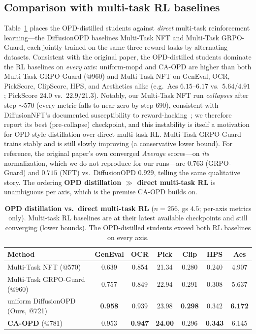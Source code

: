 \subsection{Comparison with multi-task RL baselines}
\label{sec:exp-baselines}
Table~\ref{tab:baselines} places the OPD-distilled students against \emph{direct} multi-task
reinforcement learning---the DiffusionOPD baselines Multi-Task NFT and Multi-Task GRPO-Guard, each
jointly trained on the same three reward tasks by alternating datasets. Consistent with the original
paper, the OPD-distilled students dominate the RL baselines on \emph{every} axis: uniform-mopd and
CA-OPD are higher than both Multi-Task GRPO-Guard (@960) and Multi-Task NFT on GenEval, OCR, PickScore,
ClipScore, HPS, and Aesthetics alike (e.g.\ Aes $6.15$--$6.17$ vs.\ $5.64$/$4.91$; PickScore $24.0$ vs.\
$22.9$/$21.3$). Notably, our Multi-Task NFT run \emph{collapses} after step $\sim$570 (every metric
falls to near-zero by step 690), consistent with DiffusionNFT's documented susceptibility to
reward-hacking~\cite{zheng2025diffusionnft}; we therefore report its best (pre-collapse) checkpoint,
and this instability is itself a motivation for OPD-style distillation over direct multi-task RL.
Multi-Task GRPO-Guard trains stably and is still slowly improving (a conservative lower bound). For
reference, the original paper's own converged \emph{Average} scores---on \emph{its} normalization, which
we do not reproduce for our runs---are $0.763$ (GRPO-Guard) and $0.715$ (NFT) vs.\ DiffusionOPD $0.929$,
telling the same qualitative story. The ordering \textbf{OPD distillation $\gg$ direct multi-task RL} is
unambiguous per axis, which is the premise CA-OPD builds on.

\begin{table}[t]
\centering
\caption{\textbf{OPD distillation vs.\ direct multi-task RL} ($n{=}256$, gs $4.5$; per-axis metrics
only). Multi-task RL baselines are at their latest available checkpoints and still converging (lower
bounds). The OPD-distilled students exceed both RL baselines on every axis.}
\label{tab:baselines}
\small
\setlength{\tabcolsep}{5pt}
\begin{tabular}{lcccccc}
\toprule
\textbf{Method} & \textbf{GenEval} & \textbf{OCR} & \textbf{Pick} & \textbf{Clip} & \textbf{HPS} & \textbf{Aes} \\
\midrule
Multi-Task NFT (@570)         & 0.639 & 0.854 & 21.34 & 0.280 & 0.240 & 4.907 \\
Multi-Task GRPO-Guard (@960)  & 0.757 & 0.849 & 22.94 & 0.291 & 0.308 & 5.637 \\
\midrule
uniform DiffusionOPD (Ours, @721) & \textbf{0.958} & 0.939 & 23.98 & \textbf{0.298} & 0.342 & \textbf{6.172} \\
\textbf{CA-OPD} (@781)            & 0.953 & \textbf{0.947} & \textbf{24.00} & 0.296 & \textbf{0.343} & 6.145 \\
\bottomrule
\end{tabular}
\end{table}

